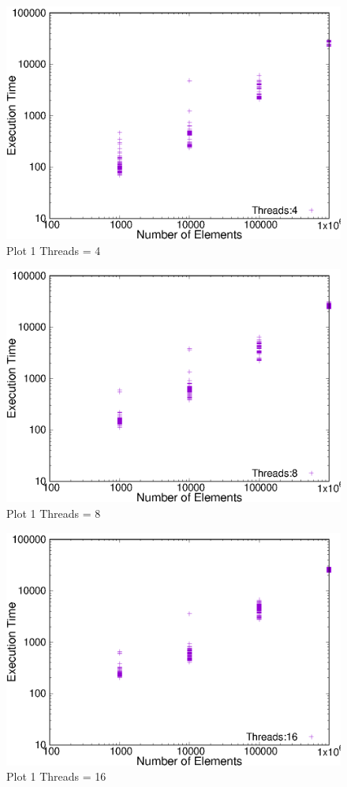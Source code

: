 \documentclass{article}
\begin{document}
\begin{figure}
\centering
\includegraphics[scale=0.9]{plot1_4.eps}
\caption{Plot 1 Threads = 4}
\end{figure}

\begin{figure}
\centering
\includegraphics[scale=0.9]{plot1_8.eps}
\caption{Plot 1 Threads = 8}
\end{figure}

\begin{figure}
\centering
\includegraphics[scale=0.9]{plot1_16.eps}
\caption{Plot 1 Threads = 16}
\end{figure}
\end{document}
